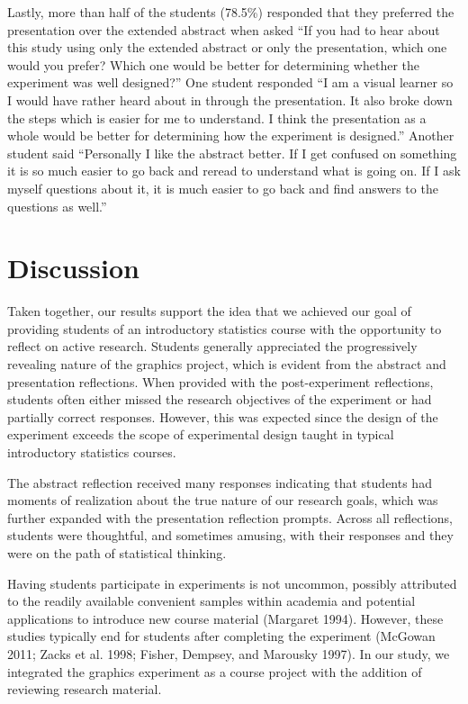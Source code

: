 \documentclass[
  12pt,
]{article}
\providecommand{\DIFdel}[1]{} %
\providecommand{\DIFadd}[1]{{\protect\color{blue} \sf #1}} %
\providecommand{\DIFdel}[1]{{\protect\color{red} [..\footnote{removed: #1} ]}} %
\providecommand{\DIFaddbegin}{} %
\providecommand{\DIFaddend}{} %
\providecommand{\DIFdelbegin}{} %
\providecommand{\DIFdelend}{} %
\newcommand{\DIFscaledelfig}{0.5}
\newlength{\DIFdelgraphicswidth} %
\newlength{\DIFdelgraphicsheight} %
\newcommand{\DIFaddincludegraphics}[2][]{{\color{blue}\fbox{\DIFOincludegraphics[#1]{#2}}}} %
\newcommand{\DIFdelincludegraphics}[2][]{%
\sbox{\DIFdelgraphicsbox}{\DIFOincludegraphics[#1]{#2}}%
\settoboxwidth{\DIFdelgraphicswidth}{\DIFdelgraphicsbox} %
\settoboxtotalheight{\DIFdelgraphicsheight}{\DIFdelgraphicsbox} %
\scalebox{\DIFscaledelfig}{%
\parbox[b]{\DIFdelgraphicswidth}{\usebox{\DIFdelgraphicsbox}\\[-\baselineskip] \rule{\DIFdelgraphicswidth}{0em}}\llap{\resizebox{\DIFdelgraphicswidth}{\DIFdelgraphicsheight}{%
\setlength{\unitlength}{\DIFdelgraphicswidth}%
\begin{picture}(1,1)%
\thicklines\linethickness{2pt} %
{\color[rgb]{1,0,0}\put(0,0){\framebox(1,1){}}}%
{\color[rgb]{1,0,0}\put(0,0){\line( 1,1){1}}}%
{\color[rgb]{1,0,0}\put(0,1){\line(1,-1){1}}}%
\end{picture}%
}\hspace*{3pt}}} %
} %
\DeclareRobustCommand{\DIFaddbegin}{\DIFOaddbegin \let\includegraphics\DIFaddincludegraphics} %
\DeclareRobustCommand{\DIFaddend}{\DIFOaddend \let\includegraphics\DIFOincludegraphics} %
\DeclareRobustCommand{\DIFdelbegin}{\DIFOdelbegin \let\includegraphics\DIFdelincludegraphics} %
\DeclareRobustCommand{\DIFdelend}{\DIFOaddend \let\includegraphics\DIFOincludegraphics} %
\begin{document}
Lastly, more than half of the students (78.5\%) responded that they
preferred the presentation over the extended abstract when asked ``If
you had to hear about this study using only the extended abstract or
only the presentation, which one would you prefer? Which one would be
better for determining whether the experiment was well designed?'' One
student responded ``I am a visual learner so I would have rather heard
about in through the presentation. It also broke down the steps which is
easier for me to understand. I think the presentation as a whole would
be better for determining how the experiment is designed.'' Another
student said ``Personally I like the abstract better. If I get confused
on something it is so much easier to go back and reread to understand
what is going on. If I ask myself questions about it, it is much easier
to go back and find answers to the questions as well.''

\section{Discussion}\label{discussion}

Taken together, our results support the idea that we achieved our goal
of providing students of an introductory statistics course with the
opportunity to reflect on active research. Students generally
appreciated the progressively revealing nature of the graphics project,
which is evident from the abstract and presentation reflections. When
provided with the post-experiment reflections, students often either
missed the research \DIFdelbegin \DIFdel{objective }\DIFdelend \DIFaddbegin \DIFadd{objectives }\DIFaddend of the experiment or had partially
correct responses. \DIFaddbegin \DIFadd{However, this was expected since the design of the
experiment exceeds the scope of experimental design taught in typical
introductory statistics courses.
}

\DIFaddend The abstract reflection received many responses indicating that students
had moments of realization about the true nature of our research goals,
which was further expanded \DIFdelbegin \DIFdel{in }\DIFdelend \DIFaddbegin \DIFadd{with }\DIFaddend the presentation reflection prompts.
Across all reflections, students were thoughtful, and sometimes amusing,
with their responses and \DIFdelbegin \DIFdel{that }\DIFdelend they were on the path of statistical thinking.

\DIFaddbegin \DIFadd{Having students participate in experiments is not uncommon, possibly
attributed to the readily available convenient samples within academia
and potential applications to introduce new course material (Margaret
1994). However, these studies typically end for students after
completing the experiment (McGowan 2011; Zacks et al. 1998; Fisher,
Dempsey, and Marousky 1997). In our study, we integrated the graphics
experiment as a course project with the addition of reviewing research
material.
}
\end{document}
